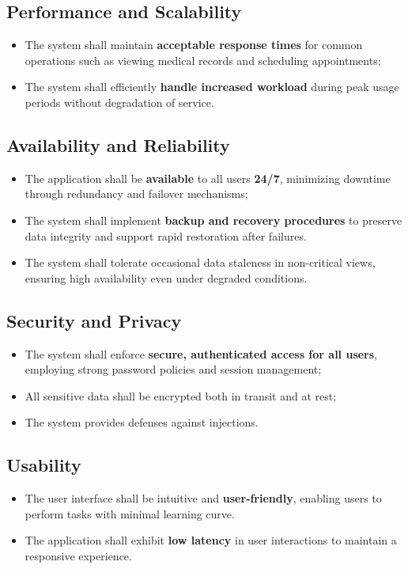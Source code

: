 \subsection{Performance and Scalability}
\begin{itemize}
	\item The system shall maintain \textbf{acceptable response times} for common operations such as viewing medical records and scheduling appointments; 
	\item The system shall efficiently \textbf{handle increased workload} during peak usage periods without degradation of service.
\end{itemize}

\subsection{Availability and Reliability}
\begin{itemize}
	\item The application shall be \textbf{available} to all users \textbf{24/7}, minimizing downtime through redundancy and failover mechanisms;
	\item The system shall implement \textbf{backup and recovery procedures} to preserve data integrity and support rapid restoration after failures.
	\item The system shall tolerate occasional data staleness in non-critical views, ensuring high availability even under degraded conditions.
\end{itemize}

\subsection{Security and Privacy}
\begin{itemize}
	\item The system shall enforce \textbf{secure, authenticated access for all users}, employing strong password policies and session management;
	\item All sensitive data shall be encrypted both in transit and at rest;
	\item The system provides defenses against injections. 
\end{itemize}

\subsection{Usability}
\begin{itemize}
	\item The user interface shall be intuitive and \textbf{user‑friendly}, enabling users to perform tasks with minimal learning curve.
	\item The application shall exhibit \textbf{low latency} in user interactions to maintain a responsive experience.
\end{itemize}

